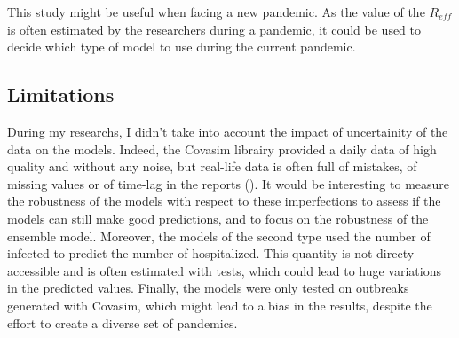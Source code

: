 This study might be useful when facing a new pandemic.
As the value of the $R_{eff}$ is often estimated by the researchers during a pandemic, it could be used to decide which type of model to use during the current pandemic. 


\subsection{Limitations}

During my researchs, I didn't take into account the impact of uncertainity of the data on the models. 
Indeed, the Covasim librairy provided a daily data of high quality and without any noise, but
real-life data is often full of mistakes, of missing values or of time-lag in the reports (\cite{greene_Nowcasting}).
It would be interesting to measure the robustness of the models with respect to these imperfections to assess if the models can still make good predictions, and to focus on the robustness of the ensemble model. 
Moreover, the models of the second type used the number of infected to predict the number of hospitalized. 
This quantity is not directy accessible and is often estimated with tests, which could lead to huge variations in the predicted values.  
Finally, the models were only tested on outbreaks generated with Covasim, which might lead to a bias in the results, despite the effort to create a diverse set of pandemics. 

